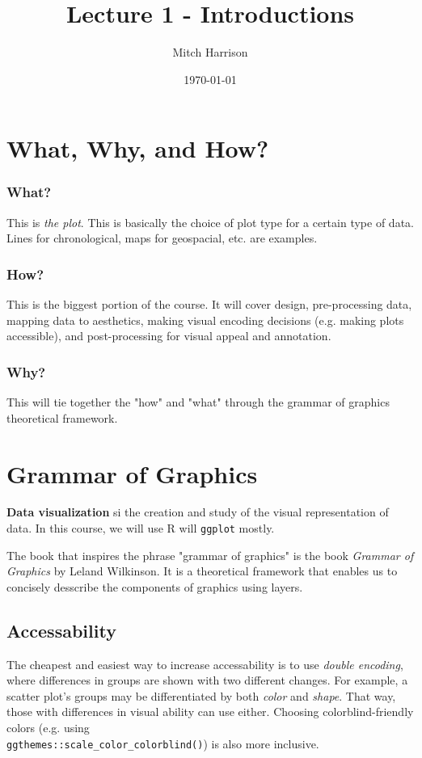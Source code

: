 \documentclass[titlepage, 12pt, leqno]{article}
\title{\Huge{Lecture 1 - Introductions}}
\author{\large{Mitch Harrison}}
\date{\today}
\begin{document}
\setlength{\parskip}{1\baselineskip}
\setlength{\parindent}{15pt}
\maketitle
\tableofcontents
\newpage


\section{What, Why, and How?}

\subsubsection{What?}
This is \textit{the plot}. This is basically the choice of plot type for a 
certain type of data. Lines for chronological, maps for geospacial, etc. are
examples.

\subsubsection{How?}
This is the biggest portion of the course. It will cover design, pre-processing
data, mapping data to aesthetics, making visual encoding decisions (e.g.
making plots accessible), and post-processing for visual appeal and annotation.

\subsubsection{Why?}
This will tie together the "how" and "what" through the grammar of graphics
theoretical framework.

\pagebreak
\section{Grammar of Graphics}
\begin{definition}
    \textbf{Data visualization} si the creation and study of the visual
    representation of data. In this course, we will use R will \texttt{ggplot} 
    mostly.
\end{definition}

The book that inspires the phrase "grammar of graphics" is the book
\textit{Grammar of Graphics} by Leland Wilkinson. It is a theoretical framework
that enables us to concisely desscribe the components of graphics using
layers.

\subsection{Accessability}
The cheapest and easiest way to increase accessability is to use \textit{double
encoding}, where differences in groups are shown with two different changes.
For example, a scatter plot's groups may be differentiated by both 
\textit{color} and \textit{shape}. That way, those with differences in visual
ability can use either. Choosing colorblind-friendly colors (e.g. using
\\ \texttt{ggthemes::scale\_color\_colorblind()}) is also more inclusive.
\end{document}
